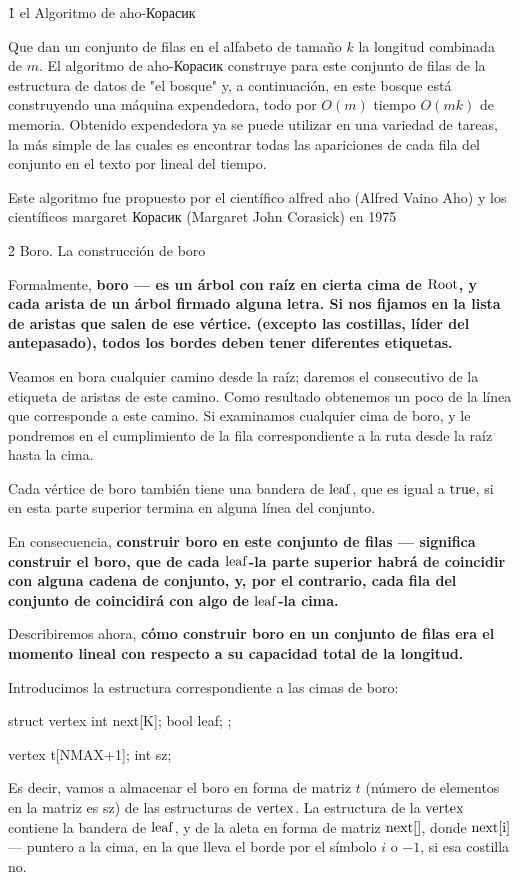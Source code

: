 \h1{ el Algoritmo de aho-Корасик }

Que dan un conjunto de filas en el alfabeto de tamaño $k$ la longitud combinada de $m$. El algoritmo de aho-Корасик construye para este conjunto de filas de la estructura de datos de "el bosque" y, a continuación, en este bosque está construyendo una máquina expendedora, todo por $O (m)$ tiempo $O (m k)$ de memoria. Obtenido expendedora ya se puede utilizar en una variedad de tareas, la más simple de las cuales es encontrar todas las apariciones de cada fila del conjunto en el texto por lineal del tiempo.

Este algoritmo fue propuesto por el científico alfred aho (Alfred Vaino Aho) y los científicos margaret Корасик (Margaret John Corasick) en 1975


\h2{ Boro. La construcción de boro }

Formalmente, \bf{boro} --- es un árbol con raíz en cierta cima de $\rm Root$, y cada arista de un árbol firmado alguna letra. Si nos fijamos en la lista de aristas que salen de ese vértice. (excepto las costillas, líder del antepasado), todos los bordes deben tener diferentes etiquetas.

Veamos en bora cualquier camino desde la raíz; daremos el consecutivo de la etiqueta de aristas de este camino. Como resultado obtenemos un poco de la línea que corresponde a este camino. Si examinamos cualquier cima de boro, y le pondremos en el cumplimiento de la fila correspondiente a la ruta desde la raíz hasta la cima.

Cada vértice de boro también tiene una bandera de $\rm leaf$, que es igual a $\rm true$, si en esta parte superior termina en alguna línea del conjunto.

En consecuencia, \bf{construir boro} en este conjunto de filas --- significa construir el boro, que de cada $\rm leaf$-la parte superior habrá de coincidir con alguna cadena de conjunto, y, por el contrario, cada fila del conjunto de coincidirá con algo de $\rm leaf$-la cima.

Describiremos ahora, \bf{cómo construir boro} en un conjunto de filas era el momento lineal con respecto a su capacidad total de la longitud.

Introducimos la estructura correspondiente a las cimas de boro:

\code
struct vertex {
int next[K];
bool leaf;
};

vertex t[NMAX+1];
int sz;
\endcode

Es decir, vamos a almacenar el boro en forma de matriz $t$ (número de elementos en la matriz es sz) de las estructuras de $\rm vertex$. La estructura de la $\rm vertex$ contiene la bandera de $\rm leaf$, y de la aleta en forma de matriz $\rm next[]$, donde $\rm next[i]$ --- puntero a la cima, en la que lleva el borde por el símbolo $i$ o $-1$, si esa costilla no.


